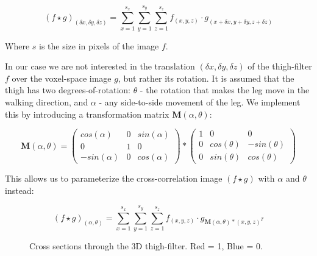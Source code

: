 \begin{equation}
	(f \star g)_{(\delta x,\delta y,\delta z)} = \sum_{x=1}^{s_{x}} \sum_{y=1}^{s_{y}} \sum_{z=1}^{s_{z}} f_{(x,y,z)} \cdot g_{(x+\delta x,y+\delta y, z+\delta z)}
\end{equation}

Where $s$ is the size in pixels of the image $f$.

In our case we are not interested in the translation $(\delta x,\delta y,\delta z)$ of the thigh-filter $f$ over the voxel-space image $g$, but rather its rotation.
It is assumed that the thigh has two degrees-of-rotation: $\theta$ - the rotation that makes the leg move in the walking direction, and $\alpha$ - any side-to-side movement of the leg.
We implement this by introducing a transformation matrix $\mathbf{M}(\alpha,\theta)$:

\begin{equation}
	\mathbf{M}(\alpha,\theta) =
	\left(\begin{array}{ccc}
		cos(\alpha) & 0 & sin(\alpha) \\
		0 & 1 & 0 \\
		-sin(\alpha) & 0 & cos(\alpha)
	\end{array} \right)
	*
	\left(\begin{array}{ccc}
		1 & 0 & 0 \\
		0 & cos(\theta) & -sin(\theta) \\
		0 & sin(\theta) & cos(\theta)
	\end{array} \right)
	\label{eqn:Matrix}
\end{equation}

This allows us to parameterize the cross-correlation image $(f \star g)$ with $\alpha$ and $\theta$ instead:

\begin{equation}
	(f \star g)_{(\alpha,\theta)} = \sum_{x=1}^{s_{x}} \sum_{y=1}^{s_{y}} \sum_{z=1}^{s_{z}} f_{(x,y,z)} \cdot g_{\mathbf{M}(\alpha,\theta) * (x,y,z)^T}
	\label{eqn:CrossCorrelation}
\end{equation}


\begin{figure}[tb]
	\centering
	\quad
	\caption{Cross sections through the 3D thigh-filter.  Red = 1, Blue = 0.}
	\label{ThighFilterCrossSections}
\end{figure}

